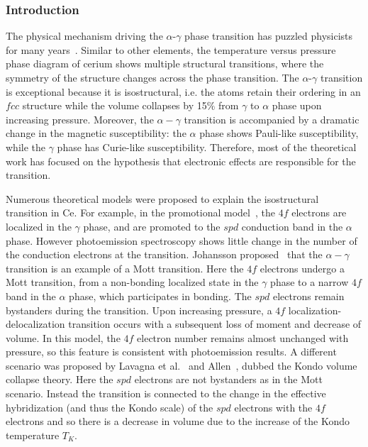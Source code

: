 \documentclass[10pt]{ruthesis}
\begin{document}
{\subsubsection{Introduction}
The physical mechanism driving the $\alpha$-$\gamma$ phase transition
has puzzled physicists for many years~\cite{ceriumREV}.  Similar to
other elements, the temperature versus pressure phase diagram of
cerium shows multiple structural transitions, where the symmetry of
the structure changes across the phase transition. The
$\alpha$-$\gamma$ transition is exceptional because it is
isostructural, i.e. the atoms retain their ordering in an $fcc$
structure while the volume collapses by 15$\%$ from $\gamma$ to
$\alpha$ phase upon increasing pressure.
Moreover, the $\alpha-\gamma$ transition is accompanied by a dramatic
change in the magnetic susceptibility: the $\alpha$ phase shows
Pauli-like susceptibility, while the $\gamma$ phase has Curie-like
susceptibility. Therefore, most of the theoretical work has focused on
the hypothesis that electronic effects are responsible for the
transition.

Numerous theoretical models were proposed to explain the isostructural
transition in Ce. For example, in the promotional
model~\cite{promotional}, the $4f$ electrons are localized in the
$\gamma$ phase, and are promoted to the $spd$ conduction band in the
$\alpha$ phase.
%
However photoemission spectroscopy shows little change in the number
of the conduction electrons at the transition.
%
Johansson proposed~\cite{johansson} that the $\alpha-\gamma$
transition is an example of a Mott transition.  Here the $4f$
electrons undergo a Mott transition, from a non-bonding localized
state in the $\gamma$ phase to a narrow $4f$ band in the $\alpha$
phase, which participates in bonding.  The $spd$ electrons remain
bystanders during the transition.  Upon increasing pressure, a $4f$
localization-delocalization transition occurs with a subsequent loss
of moment and decrease of volume.  In this model, the $4f$ electron
number remains almost unchanged with pressure, so this feature is
consistent with photoemission results.  A different scenario was
proposed by Lavagna et al.~\cite{lavagna} and Allen~\cite{allenCe},
dubbed the Kondo volume collapse theory. Here the $spd$ electrons are
not bystanders as in the Mott scenario. Instead the transition is
connected to the change in the effective hybridization (and thus the
Kondo scale) of the $spd$ electrons with the $4f$ electrons and so
there is a decrease in volume due to the increase of the Kondo
temperature $T_K$.

}
\end{document}

